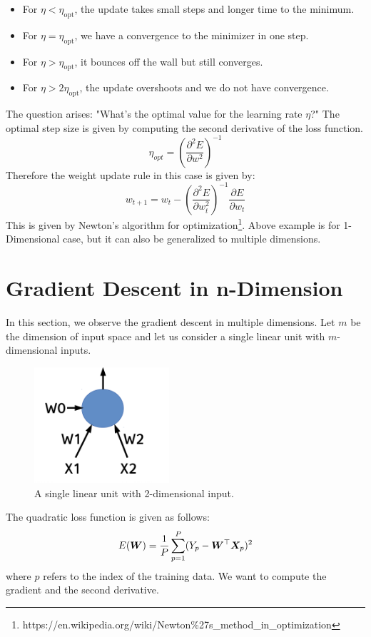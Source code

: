 \begin{itemize}
    \item For $\eta < \eta_{\textrm{opt}}$, the update takes small steps and longer time to the minimum.
    \item For $\eta=\eta_{\textrm{opt}}$, we have a convergence to the minimizer in one step.
    \item For $\eta > \eta_{\textrm{opt}}$, it bounces off the wall but still converges.
    \item For $\eta > 2 \eta_{\textrm{opt}}$, the update overshoots and we do not have convergence.
    
\end{itemize}

The question arises: "What's the optimal value for the learning rate $\eta$?" The optimal step size is given by computing the second derivative of the loss function.
$$ \eta_{opt} = (\frac{\partial^2 E}{\partial w^2})^{-1} $$
Therefore the weight update rule in this case is given by:
$$ w_{t+1} = w_t - (\frac{\partial^2 E}{\partial w_{t}^2})^{-1}\frac{\partial E}{\partial w_t}  $$
This is given by Newton's algorithm for optimization\footnote{https://en.wikipedia.org/wiki/Newton\%27s\_method\_in\_optimization}. Above example is for 1-Dimensional case, but it can also be generalized to multiple dimensions.


\section{Gradient Descent in n-Dimension}

In this section, we observe the gradient descent in multiple dimensions. Let $m$ be the dimension of input space and let us consider a single linear unit with $m$-dimensional inputs.
\begin{figure}[t]
\centering
\includegraphics[width=50mm]{figs/su.png}
\caption{A single linear unit with 2-dimensional input.}
\end{figure}
The quadratic loss function is given as follows: 
$$ E(\vect{W})= \frac{1}{P}\sum_{p=1}^P(Y_{p} - \vect{W}^{\top}\vect{X}_{p})^2$$
where $p$ refers to the index of the training data. We want to compute the gradient and the second derivative.

